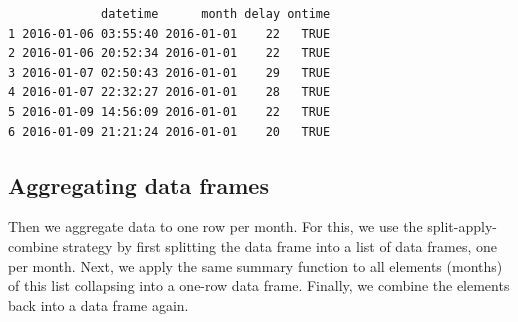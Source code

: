 \documentclass[
]{book}
\newenvironment{Shaded}{\begin{snugshade}}{\end{snugshade}}
\newcommand{\AttributeTok}[1]{\textcolor[rgb]{0.13,0.29,0.53}{#1}}
\newcommand{\CommentTok}[1]{\textcolor[rgb]{0.56,0.35,0.01}{\textit{#1}}}
\newcommand{\ConstantTok}[1]{\textcolor[rgb]{0.56,0.35,0.01}{#1}}
\newcommand{\ControlFlowTok}[1]{\textcolor[rgb]{0.13,0.29,0.53}{\textbf{#1}}}
\newcommand{\DecValTok}[1]{\textcolor[rgb]{0.00,0.00,0.81}{#1}}
\newcommand{\FunctionTok}[1]{\textcolor[rgb]{0.13,0.29,0.53}{\textbf{#1}}}
\newcommand{\NormalTok}[1]{#1}
\newcommand{\OtherTok}[1]{\textcolor[rgb]{0.56,0.35,0.01}{#1}}
\newcommand{\SpecialCharTok}[1]{\textcolor[rgb]{0.81,0.36,0.00}{\textbf{#1}}}
\begin{document}
\begin{Shaded}
\end{Shaded}

\begin{verbatim}
             datetime      month delay ontime
1 2016-01-06 03:55:40 2016-01-01    22   TRUE
2 2016-01-06 20:52:34 2016-01-01    22   TRUE
3 2016-01-07 02:50:43 2016-01-01    29   TRUE
4 2016-01-07 22:32:27 2016-01-01    28   TRUE
5 2016-01-09 14:56:09 2016-01-01    22   TRUE
6 2016-01-09 21:21:24 2016-01-01    20   TRUE
\end{verbatim}

\subsection{Aggregating data frames}\label{aggregating-data-frames}

Then we aggregate data to one row per month. For this, we use the split-apply-combine strategy by first splitting the data frame into a list of data frames, one per month. Next, we apply the same summary function to all elements (months) of this list collapsing into a one-row data frame. Finally, we combine the elements back into a data frame again.

\begin{Shaded}
\end{Shaded}
\end{document}
